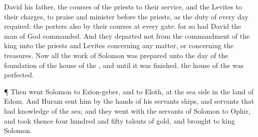 {David his
father, the
courses of the
priests to their
service, and the
Levites to their
charges, to
praise and
minister before the
priests, as the
duty of every
day
required: the
porters also by their
courses at every
gate: for so had
David the
man of
God
commanded.
And they
departed not from the
commandment of the
king unto the
priests and
Levites concerning any
matter, or concerning the
treasures.
Now all the
work of
Solomon was
prepared unto the
day of the
foundation of the
house of the
{}, and until it was
finished.
{} the
house of the
{} was
perfected.
\par }{\PP {}¶ Then
went
Solomon to
Ezion-geber, and to
Eloth, at the
sea
side in the
land of
Edom.
And
Huram
sent him by the
hands of his
servants
ships, and
servants that had
knowledge of the
sea; and they
went with the
servants of
Solomon to
Ophir, and
took thence
four
hundred and
fifty
talents of
gold, and
brought
{} to
king
Solomon.

}
